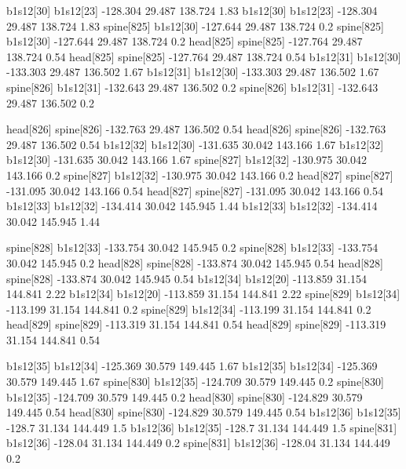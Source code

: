 b1s12[30]    b1s12[23]    -128.304    29.487    138.724    1.83
b1s12[30]    b1s12[23]    -128.304    29.487    138.724    1.83
spine[825]    b1s12[30]    -127.644    29.487    138.724    0.2
spine[825]    b1s12[30]    -127.644    29.487    138.724    0.2
head[825]    spine[825]    -127.764    29.487    138.724    0.54
head[825]    spine[825]    -127.764    29.487    138.724    0.54
b1s12[31]    b1s12[30]    -133.303    29.487    136.502    1.67
b1s12[31]    b1s12[30]    -133.303    29.487    136.502    1.67
spine[826]    b1s12[31]    -132.643    29.487    136.502    0.2
spine[826]    b1s12[31]    -132.643    29.487    136.502    0.2


head[826]    spine[826]    -132.763    29.487    136.502    0.54
head[826]    spine[826]    -132.763    29.487    136.502    0.54
b1s12[32]    b1s12[30]    -131.635    30.042    143.166    1.67
b1s12[32]    b1s12[30]    -131.635    30.042    143.166    1.67
spine[827]    b1s12[32]    -130.975    30.042    143.166    0.2
spine[827]    b1s12[32]    -130.975    30.042    143.166    0.2
head[827]    spine[827]    -131.095    30.042    143.166    0.54
head[827]    spine[827]    -131.095    30.042    143.166    0.54
b1s12[33]    b1s12[32]    -134.414    30.042    145.945    1.44
b1s12[33]    b1s12[32]    -134.414    30.042    145.945    1.44


spine[828]    b1s12[33]    -133.754    30.042    145.945    0.2
spine[828]    b1s12[33]    -133.754    30.042    145.945    0.2
head[828]    spine[828]    -133.874    30.042    145.945    0.54
head[828]    spine[828]    -133.874    30.042    145.945    0.54
b1s12[34]    b1s12[20]    -113.859    31.154    144.841    2.22
b1s12[34]    b1s12[20]    -113.859    31.154    144.841    2.22
spine[829]    b1s12[34]    -113.199    31.154    144.841    0.2
spine[829]    b1s12[34]    -113.199    31.154    144.841    0.2
head[829]    spine[829]    -113.319    31.154    144.841    0.54
head[829]    spine[829]    -113.319    31.154    144.841    0.54


b1s12[35]    b1s12[34]    -125.369    30.579    149.445    1.67
b1s12[35]    b1s12[34]    -125.369    30.579    149.445    1.67
spine[830]    b1s12[35]    -124.709    30.579    149.445    0.2
spine[830]    b1s12[35]    -124.709    30.579    149.445    0.2
head[830]    spine[830]    -124.829    30.579    149.445    0.54
head[830]    spine[830]    -124.829    30.579    149.445    0.54
b1s12[36]    b1s12[35]    -128.7    31.134    144.449    1.5
b1s12[36]    b1s12[35]    -128.7    31.134    144.449    1.5
spine[831]    b1s12[36]    -128.04    31.134    144.449    0.2
spine[831]    b1s12[36]    -128.04    31.134    144.449    0.2


